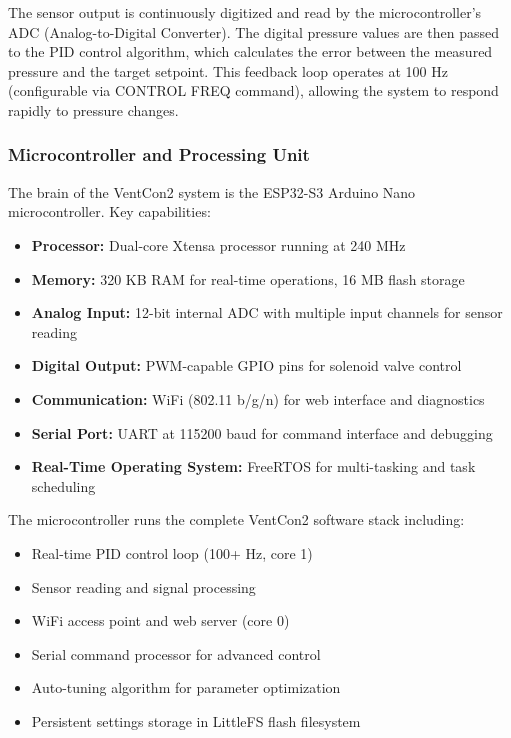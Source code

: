 \documentclass[12pt,a4paper]{article}
\begin{document}
The sensor output is continuously digitized and read by the microcontroller's ADC (Analog-to-Digital Converter). The digital pressure values are then passed to the PID control algorithm, which calculates the error between the measured pressure and the target setpoint. This feedback loop operates at 100 Hz (configurable via CONTROL FREQ command), allowing the system to respond rapidly to pressure changes.

\subsubsection{Microcontroller and Processing Unit}

The brain of the VentCon2 system is the ESP32-S3 Arduino Nano microcontroller. Key capabilities:

    \begin{itemize}
        \item \textbf{Processor:} Dual-core Xtensa processor running at 240 MHz
        \item \textbf{Memory:} 320 KB RAM for real-time operations, 16 MB flash storage
        \item \textbf{Analog Input:} 12-bit internal ADC with multiple input channels for sensor reading
        \item \textbf{Digital Output:} PWM-capable GPIO pins for solenoid valve control
        \item \textbf{Communication:} WiFi (802.11 b/g/n) for web interface and diagnostics
        \item \textbf{Serial Port:} UART at 115200 baud for command interface and debugging
        \item \textbf{Real-Time Operating System:} FreeRTOS for multi-tasking and task scheduling
    \end{itemize}

The microcontroller runs the complete VentCon2 software stack including:

    \begin{itemize}
        \item Real-time PID control loop (100+ Hz, core 1)
        \item Sensor reading and signal processing
        \item WiFi access point and web server (core 0)
        \item Serial command processor for advanced control
        \item Auto-tuning algorithm for parameter optimization
        \item Persistent settings storage in LittleFS flash filesystem
    \end{itemize}
\end{document}
